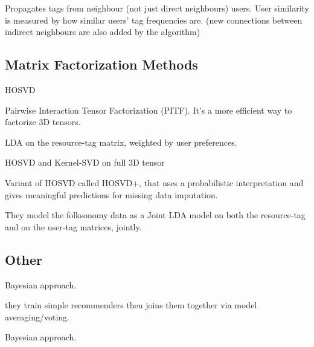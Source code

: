 \cite{gueye_etal_2014} Propagates tags from neighbour (not just direct neighbours) users. User similarity is measured by how similar users' tag frequencies are.
(new connections between indirect neighbours are also added by the algorithm)


\subsection{Matrix Factorization Methods}

\cite{symeonidis_etal_2008} HOSVD

\cite{rendle_schmidt-thieme_2010} Pairwise Interaction Tensor Factorization (PITF). It's a more efficient way to factorize 3D tensors.

\cite{harvey_etal_2010} LDA on the resource-tag matrix, weighted by user preferences.

\cite{symeonidis_etal_2010} HOSVD and Kernel-SVD on full 3D tensor

\cite{yang_etal_2012} Variant of HOSVD called HOSVD+, that uses a probabilistic interpretation and gives meaningful predictions for missing data imputation.

\cite{yao_etal_2017}
They model the folksonomy data as a Joint LDA model on both the resource-tag and on the user-tag matrices, jointly.

\subsection{Other}

\cite{hu_etal_2010} Bayesian approach.

\cite{krestel_fankhauser_2010} they train simple recommenders then joins them together via model averaging/voting.

\cite{yin_etal_2010} Bayesian approach.